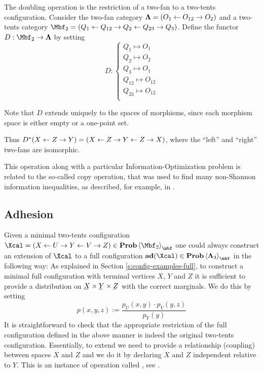   The doubling operation is the restriction of a two-fan to a two-tents
  configuration.
  Consider the two-fan category $\bm\Lambda=(O_{1}\stackrel{}{\leftarrow}
  O_{12}\stackrel{}{\rightarrow} O_{2})$ and a two-tents category $\Mbf_{2}=(Q_{1}\ot
  Q_{12}\to Q_{2}\ot Q_{23}\to Q_{3})$. Define the functor
  $D:\Mbf_{2}\to\Lambdabf$ by setting
  \[
  D:
  \begin{cases}
    Q_{1}\mapsto O_{1}\\
    Q_{2}\mapsto O_{2}\\
    Q_{3}\mapsto O_{1}\\
    Q_{12}\mapsto O_{12}\\
    Q_{23}\mapsto O_{12}\\
  \end{cases}
  \]

  Note that $D$ extends uniquely to the spaces of morphisms, since each
  morphism space is either empty or a one-point set.
  
  Thus $D^{*}(X\stackrel{}{\leftarrow} Z\stackrel{}{\rightarrow} Y)=(X\stackrel{}{\leftarrow} Z\stackrel{}{\rightarrow} Y\stackrel{}{\leftarrow} Z\stackrel{}{\rightarrow} X)$, where the ``left''
  and ``right'' two-fans are isomorphic.
  
  This operation along with a particular Information-Optimization
    problem is related to the so-called copy operation, that was
  used to find many non-Shannon information inequalities, as
  described, for example, in \cite{Dougherty-Non-Shannon-2011}.

\subsection{Adhesion}\label{s:config-adhesion}
  Given a minimal two-tents configuration $\Xcal=(X\ot U\to Y\ot V\to
  Z)\in\prob\<\Mbf_{2}>_{\mbf}$ one could always construct an extension of
  $\Xcal$ to a full configuration $\ad(\Xcal)\in\prob\<\Lambdabf_{3}>_{\mbf}$ in the
  following way: As explained in Section \ref{s:config-examples-full},
  to construct a minimal full configuration with terminal vertices
  $X$, $Y$ and $Z$ it is sufficient to provide a distribution on $\un
  X\times\un Y\times\un Z$ with the correct marginals. We do this
  by setting
  \[
  p(x,y,z):=\frac{p_{U}(x,y)\cdot p_{V}(y,z)}{p_{Y}(y)}
  \]
  It is straightforward to check that the appropriate restriction of
  the full configuration defined in the above manner is indeed the
  original two-tents configuration.  Essentially, to extend we need to
  provide a relationship (coupling) between spaces $X$ and $Z$ and we
  do it by declaring $X$ and $Z$ independent relative to $Y$.  This is
  an instance of operation called , see
  \cite{Matus-Infinitely-2007}.

